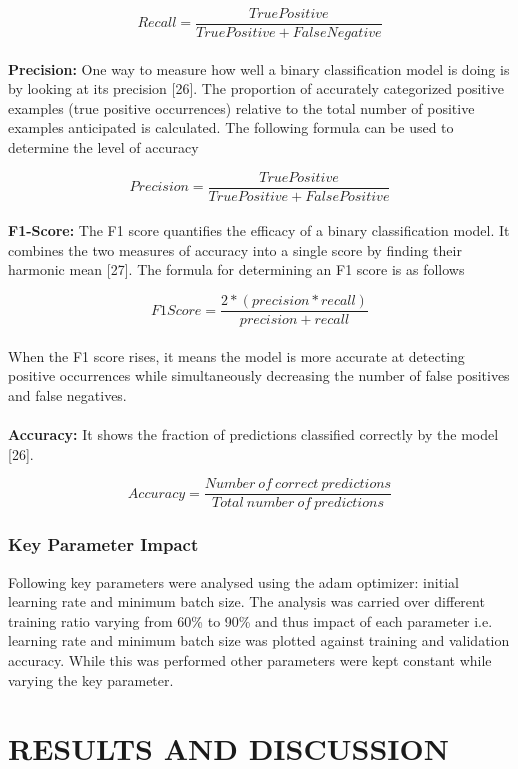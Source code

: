 \documentclass{ieeeaccess}
\begin{document}
\[ Recall=\frac{True Positive}{True Positive + False Negative}\]
\\
\textbf{Precision:} One way to measure how well a binary classification model is doing is by looking at its precision [26]. The proportion of accurately categorized positive examples (true positive occurrences) relative to the total number of positive examples anticipated is calculated. The following formula can be used to determine the level of accuracy

\[ Precision=\frac{True Positive}{True Positive + False Positive}\]
\\
\textbf{F1-Score:} The F1 score quantifies the efficacy of a binary classification model. It combines the two measures of accuracy into a single score by finding their harmonic mean [27]. The formula for determining an F1 score is as follows

\[ F1 Score=\frac{2*(precision * recall)}{precision + recall}\]
\\
When the F1 score rises, it means the model is more accurate at detecting positive occurrences while simultaneously decreasing the number of false positives and false negatives.
\\
\\
\textbf{Accuracy:} It shows the fraction of predictions classified correctly by the model [26].

\[ Accuracy=\frac{Number \ of\ correct\ predictions}{Total\ number\ of\ predictions}\]

\subsubsection{Key Parameter Impact}
Following key parameters were analysed using the adam optimizer: initial learning rate and minimum batch size. The analysis was carried over different training ratio varying from 60\% to 90\% and thus impact of each parameter i.e. learning rate and minimum batch size was plotted against training and validation accuracy. While this was performed other parameters were kept constant while varying the key parameter.

\section{RESULTS AND DISCUSSION}
\end{document}
